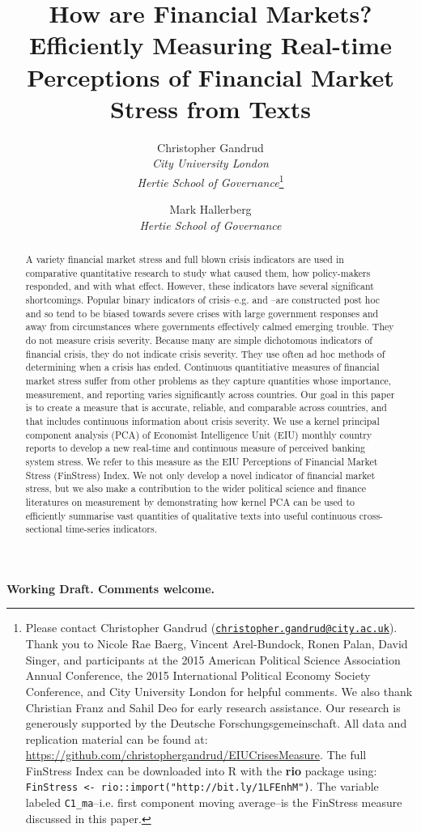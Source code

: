 \documentclass[]{article}
\title{How are Financial Markets? Efficiently Measuring Real-time Perceptions of Financial Market Stress from Texts}
\author{Christopher Gandrud \\ \emph{City University London} \\ \emph{Hertie School of Governance}\footnote{Please contact Christopher Gandrud
(\href{mailto:christopher.gandrud@city.ac.uk}{\nolinkurl{christopher.gandrud@city.ac.uk}}).
Thank you to Nicole Rae Baerg, Vincent Arel-Bundock, Ronen Palan, David Singer, and participants at the 2015 American Political Science Association Annual Conference, the 2015 International Political Economy Society Conference, and City University London for helpful comments. We also thank Christian Franz and Sahil Deo for early research assistance. Our research is generously supported by the Deutsche Forschungsgemeinschaft. All data and replication material can be found at:
\url{https://github.com/christophergandrud/EIUCrisesMeasure}. The full FinStress Index can be downloaded into R with the \textbf{rio} package using: \texttt{FinStress <- rio::import("http://bit.ly/1LFEnhM")}. The variable labeled \texttt{C1\_ma}--i.e. first component moving average--is the FinStress measure discussed in this paper.}
\and
Mark Hallerberg \\ \emph{Hertie School of Governance}}
\begin{document}
\maketitle

\begin{center}
    \textbf{Working Draft. Comments welcome.}
\end{center}

\begin{abstract}
    A variety financial market stress and full blown crisis indicators are used in comparative quantitative research to study what caused them, how policy-makers responded, and with what effect. However, these indicators have several significant shortcomings. Popular binary indicators of crisis--e.g. \cite{Reinhart2009,ReinhartRog2010} and \cite{laeven2013}--are constructed post hoc and so tend to be biased towards severe crises with large government responses and away from circumstances where governments effectively calmed emerging trouble. They do not measure crisis severity. Because many are simple dichotomous indicators of financial crisis, they do not indicate crisis severity. They use often ad hoc methods of determining when a crisis has ended. Continuous quantitiative measures of financial market stress suffer from other problems as they capture quantities whose importance, measurement, and reporting varies significantly across countries.  Our goal in this paper is to create a measure that is accurate, reliable, and comparable across countries, and that includes continuous information about crisis severity. We use a kernel principal component analysis (PCA) of Economist Intelligence Unit (EIU) monthly country reports to develop a new real-time and continuous measure of perceived banking system stress. We refer to this measure as the EIU Perceptions of Financial Market Stress (FinStress) Index. We not only develop a novel indicator of financial market stress, but we also make a contribution to the wider political science and finance literatures on measurement by demonstrating how kernel PCA can be used to efficiently summarise vast quantities of qualitative texts into useful continuous cross-sectional time-series indicators.

\end{abstract}
\end{document}
